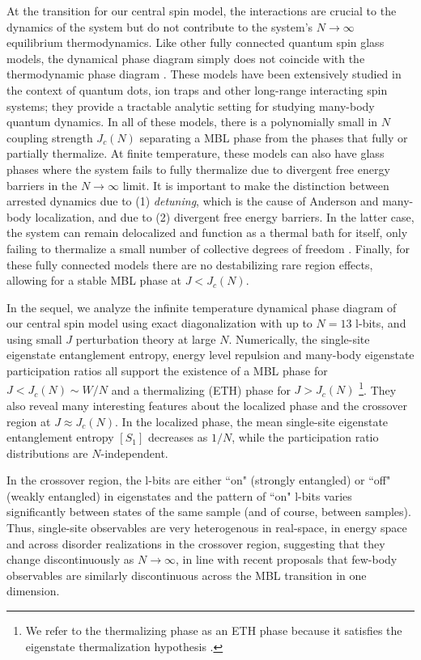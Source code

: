 \documentclass[aps,pra,twocolumn,a4paper,showpacs,superscriptaddress,floatfix,10pt]{revtex4}
\begin{document}
At the transition for our central spin model, the interactions are crucial to the dynamics of the system but do not contribute to the system's $N\rightarrow\infty$ equilibrium thermodynamics.
Like other fully connected quantum spin glass models, the dynamical phase diagram simply does not coincide with the thermodynamic phase diagram \cite{Cugliandolo:2001aa,Laumann:2014aa,Burin:2016aa,Baldwin:2017aa,Mezard:1987aa}.
These models have been extensively studied in the context of quantum dots, ion traps and other long-range interacting spin systems; they provide a tractable analytic setting for studying many-body quantum dynamics.
%
In all of these models, there is a polynomially small in $N$ coupling strength $J_c(N)$ separating a MBL phase from the phases that fully or partially thermalize. At finite temperature, these models can also have glass phases where the system fails to fully thermalize due to divergent free energy barriers in the $N\rightarrow\infty$ limit.
It is important to make the distinction between arrested dynamics due to (1) {\it detuning}, which is the cause of Anderson and many-body localization, and due to (2) divergent free energy barriers.
In the latter case, the system can remain delocalized and function as a thermal bath for itself, only failing to thermalize a small number of collective degrees of freedom \cite{Baldwin:2017aa}.
Finally, for these fully connected models there are no destabilizing rare region effects, allowing for a stable MBL phase at $J < J_c(N)$.

In the sequel, we analyze the infinite temperature dynamical phase diagram of our central spin model using exact diagonalization with up to $N=13$ l-bits, and using small $J$ perturbation theory at large $N$.
Numerically, the single-site eigenstate entanglement entropy, energy level repulsion and many-body eigenstate participation ratios all support the existence of a MBL phase for $J < J_c(N) \sim W/N$ and a thermalizing (ETH) phase for $J > J_c(N)$ \footnote{We refer to the thermalizing phase as an ETH phase because it satisfies the eigenstate thermalization hypothesis \cite{Deutsch:1991ss,Srednicki:1994dw,Rigol:2008bh,DAlessio:2016aa,Borgonovi:2016aa}.}.
They also reveal many interesting features about the localized phase and the crossover region at $J \approx J_c(N)$.
In the localized phase, the mean single-site eigenstate entanglement entropy $[S_1]$ decreases as $1/N$, while the participation ratio distributions are $N$-independent.

In the crossover region, the l-bits are either ``on" (strongly entangled) or ``off" (weakly entangled) in eigenstates and the pattern of ``on" l-bits varies significantly between states of the same sample (and of course, between samples).
Thus, single-site observables are very heterogenous in real-space, in energy space and across disorder realizations in the crossover region, suggesting that they change discontinuously as $N\to \infty$, in line with recent proposals \cite{Yu:2016aa,Khemani:2016aa} that few-body observables are similarly discontinuous across the MBL transition in one dimension.
\end{document}
